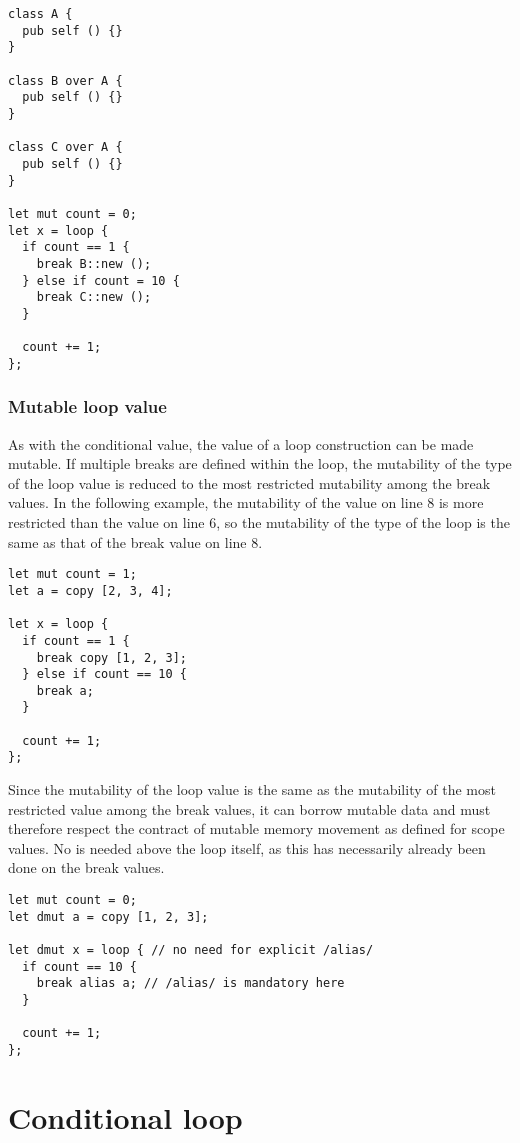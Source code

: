 \begin{lstlisting}[style=coloredverbatim]
class A {
  pub self () {}
}

class B over A {
  pub self () {}
}

class C over A {
  pub self () {}
}

let mut count = 0;
let x = loop {
  if count == 1 {
    break B::new ();
  } else if count = 10 {
    break C::new ();
  }

  count += 1;
};
\end{lstlisting}


\subsubsection {Mutable loop value}

As with the conditional value, the value of a loop construction can be made
mutable. If multiple breaks are defined within the loop, the mutability of the
type of the loop value is reduced to the most restricted mutability among the
break values. In the following example, the mutability of the value on line 8 is
more restricted than the value on line 6, so the mutability of the type of the
loop is the same as that of the break value on line 8.

\begin{lstlisting}[style=coloredverbatim]
let mut count = 1;
let a = copy [2, 3, 4];

let x = loop {
  if count == 1 {
    break copy [1, 2, 3];
  } else if count == 10 {
    break a;
  }

  count += 1;
};
\end{lstlisting}

Since the mutability of the loop value is the same as the mutability of the most
restricted value among the break values, it can borrow mutable data and must
therefore respect the contract of mutable memory movement as defined for scope
values. No  is needed above the loop itself, as this has
necessarily already been done on the break values.

\begin{lstlisting}[style=coloredverbatim]
let mut count = 0;
let dmut a = copy [1, 2, 3];

let dmut x = loop { // no need for explicit /alias/
  if count == 10 {
    break alias a; // /alias/ is mandatory here
  }

  count += 1;
};
\end{lstlisting}

\section{Conditional loop}%
\label{sec:while_loop}

